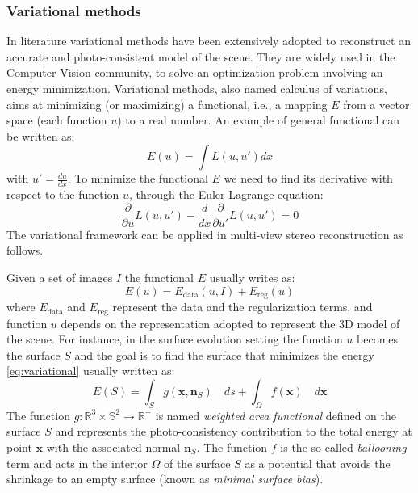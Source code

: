 \subsubsection{Variational methods}
\label{subsec:variational}
In literature variational methods have been extensively adopted to reconstruct an accurate and photo-consistent model of the scene.
 They are widely used in the Computer Vision community, to solve an optimization problem involving an energy minimization.
Variational methods, also named  calculus of variations, aims at minimizing (or maximizing) a functional, i.e., a mapping $E$ from a vector space (each function $u$) to a real number. 
An example of general functional can be written as:
\begin{equation*}
 E(u) = \int \mathit{L} (u, u')dx
\end{equation*}
with $u'=\frac{du}{dx}$.
To minimize the functional $E$ we need to find its derivative with respect to the function $u$, through the Euler-Lagrange equation:
\begin{equation*}
 \frac{\partial}{\partial u} \mathit{L} (u, u') - \frac{d}{dx} \frac{\partial}{\partial u'}\mathit{L} (u, u') =0
\end{equation*}
The variational framework can be applied in multi-view stereo reconstruction \cite{hermosillo2002variational} as follows.

Given a set of images $\mathit{I}$ the functional $E$ usually writes as:
\begin{equation}
\label{eq:variational}
E(\mathit{u}) = E_{\text{data}}(\mathit{u}, \mathit{I}) + E_{\text{reg}} (\mathit{u})  
\end{equation}
where $E_{\text{data}}$  and $E_{\text{reg}}$ represent the data and the regularization terms, and function $\mathit{u}$ depends on the representation adopted to represent the 3D model of the scene.
For instance, in the surface evolution setting the function $\mathit{u}$ becomes the surface $\mathit{S}$ and the goal is to find the surface that minimizes the energy \eqref{eq:variational} usually written as:
\begin{equation*}
 E(\mathit{S}) = \int_{\mathit{S}} g(\mathbf{x}, \mathbf{n}_{\mathit{S}}) \quad ds  +\int_{\mathit{\Omega}} f(\mathbf{x}) \quad d\mathbf{x}
\end{equation*}
The function $\mathit{g}:\mathbb{R}^3\times\mathbb{S}^2 \rightarrow \mathbb{R}^+$ is named \emph{weighted area functional}  defined on the surface $\mathit{S}$ and represents the photo-consistency contribution to the total energy at point $\mathbf{x}$ with the associated normal $\mathbf{n}_{\mathit{S}}$.
The function $\mathit{f}$ is the so called \emph{ballooning} term and acts in the interior $\mathit{\Omega}$ of the surface $\mathit{S}$ as a potential that avoids the shrinkage to an empty surface (known as \emph{minimal surface bias}).

